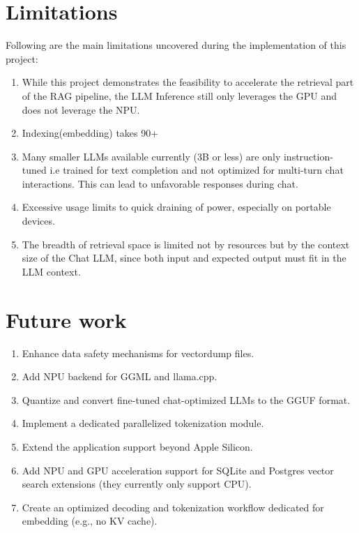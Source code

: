 \section{Limitations}
\label{sec:Limitations}
Following are the main limitations uncovered during the implementation of this project:
\begin{enumerate}[label=\alph*.]
\item While this project demonstrates the feasibility to accelerate the retrieval part of the RAG pipeline, the LLM Inference still only leverages the GPU and does not leverage the NPU.

\item Indexing(embedding) takes 90+%

\item Many smaller LLMs available currently (3B or less) are only instruction-tuned i.e trained for text completion and not optimized for multi-turn chat interactions. This can lead to unfavorable responses during chat.

\item Excessive usage limits to quick draining of power, especially on portable devices.

\item The breadth of retrieval space is limited not by resources but by the context size of the Chat LLM, since both input and expected output must fit in the LLM context.

\end{enumerate}
\section{Future work}
\label{sec:FutureWork}
\begin{enumerate}[label=\alph*.]
    \item Enhance data safety mechanisms for vectordump files.
    \item Add NPU backend for GGML and llama.cpp.
    \item Quantize and convert fine-tuned chat-optimized LLMs to the GGUF format.
    \item Implement a dedicated parallelized tokenization module.
    \item Extend the application support beyond Apple Silicon.
    \item Add NPU and GPU acceleration support for SQLite and Postgres vector search extensions (they currently only support CPU).
    \item Create an optimized decoding and tokenization workflow dedicated for embedding (e.g., no KV cache).
\end{enumerate}